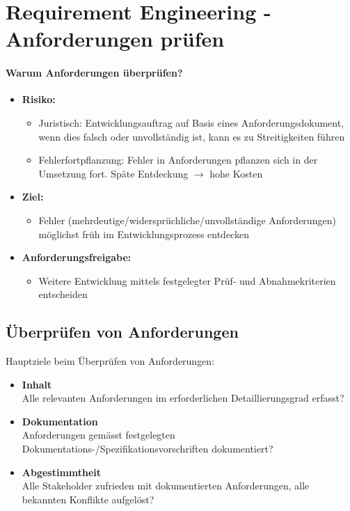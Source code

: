 \documentclass[a4paper]{article}
\begin{document}
	\section{Requirement Engineering - Anforderungen prüfen}
	
				\paragraph{Warum Anforderungen überprüfen?}
				
				\begin{itemize}
					\item \textbf{Risiko:}
						\begin{itemize}
							\item Juristisch:
								Entwicklungsauftrag auf Basis eines Anforderungsdokument, wenn dies falsch oder unvollständig ist, kann es zu Streitigkeiten führen
							\item Fehlerfortpflanzung:
								Fehler in Anforderungen pflanzen sich in der Umsetzung fort.
								Späte Entdeckung $\rightarrow$ hohe Kosten
						\end{itemize}
					\item \textbf{Ziel:}
						\begin{itemize}
							\item Fehler (mehrdeutige/widersprüchliche/unvollständige Anforderungen) möglichst früh im Entwicklungsprozess entdecken
						\end{itemize}
					\item \textbf{Anforderungsfreigabe:}
						\begin{itemize}
							\item Weitere Entwicklung mittels festgelegter Prüf- und Abnahmekriterien entscheiden
						\end{itemize}
				\end{itemize}
	
		\subsection{Überprüfen von Anforderungen}
		
		Hauptziele beim Überprüfen von Anforderungen:
		
		\begin{itemize}
			\item \textbf{Inhalt}\\
			Alle relevanten Anforderungen im erforderlichen Detaillierungsgrad erfasst?
			\item \textbf{Dokumentation}\\
			Anforderungen gemässt festgelegten Dokumentations-/Spezifikationsvorschriften dokumentiert?
			\item \textbf{Abgestimmtheit}\\
			Alle Stakeholder zufrieden mit dokumentierten Anforderungen, alle bekannten Konflikte aufgelöst?
		\end{itemize}
			
\end{document}
